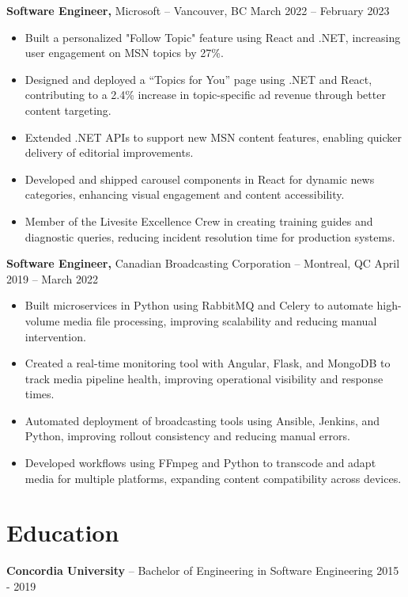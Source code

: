 \documentclass[11pt]{article}       %
\begin{document}
\textbf{Software Engineer,} {Microsoft} -- Vancouver, BC \hfill March 2022 -- February 2023 \\
\vspace{-9pt}
\begin{itemize}
  \item Built a personalized "Follow Topic" feature using React and .NET, increasing user engagement on MSN topics by 27\%.
  \item Designed and deployed a “Topics for You” page using .NET and React, contributing to a 2.4\% increase in topic-specific ad revenue through better content targeting.
  \item Extended .NET APIs to support new MSN content features, enabling quicker delivery of editorial improvements.
  \item Developed and shipped carousel components in React for dynamic news categories, enhancing visual engagement and content accessibility.
  \item Member of the Livesite Excellence Crew in creating training guides and diagnostic queries, reducing incident resolution time for production systems.
\end{itemize}

\textbf{Software Engineer,} {Canadian Broadcasting Corporation} -- Montreal, QC \hfill April 2019 -- March 2022 \\
\vspace{-9pt}
\begin{itemize}
  \item Built microservices in Python using RabbitMQ and Celery to automate high-volume media file processing, improving scalability and reducing manual intervention.
  \item Created a real-time monitoring tool with Angular, Flask, and MongoDB to track media pipeline health, improving operational visibility and response times.
  \item Automated deployment of broadcasting tools using Ansible, Jenkins, and Python, improving rollout consistency and reducing manual errors.
  \item Developed workflows using FFmpeg and Python to transcode and adapt media for multiple platforms, expanding content compatibility across devices.
\end{itemize}

\vspace{-18.5pt}

\section*{Education}
\textbf{Concordia University} -- Bachelor of Engineering in Software Engineering \hfill 2015 - 2019
\end{document}
